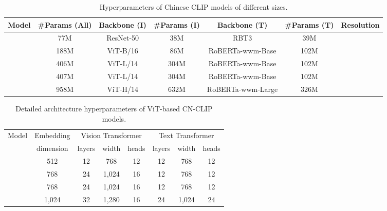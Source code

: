 \documentclass[11pt]{article}
\begin{document}
\begin{table*}[t]
\center
\small
\vskip 0.15in
\begin{adjustbox}{max width=1.\textwidth}
\begin{tabular}{@{\extracolsep{\fill}}lcccccc}
\toprule
  Model
  & \#Params (All)
  & Backbone (I)
  & \#Params (I)
  & Backbone (T)
  & \#Params (T)
  & Resolution
  \\
\midrule
    
    & 77M & ResNet-50 & 38M & RBT3 & 39M & 
    \\
    
    & 188M & ViT-B/16 & 86M & RoBERTa-wwm-Base & 102M & 
    \\
    
    & 406M & ViT-L/14 & 304M & RoBERTa-wwm-Base & 102M & 
    \\
    
    & 407M & ViT-L/14 & 304M & RoBERTa-wwm-Base & 102M & 
    \\
    
    & 958M & ViT-H/14 & 632M & RoBERTa-wwm-Large & 326M & 
    \\
\bottomrule
\end{tabular}
\end{adjustbox}
\caption{Hyperparameters of Chinese CLIP models of different sizes. }
\label{tb:modelcard}
\end{table*} 
\begin{table*}[t]
\center
\small
\begin{tabular}{@{\extracolsep{\fill}}lccccccc}
\toprule
  \multirow{2}{*}{Model}
  & Embedding
  & \multicolumn{3}{c}{Vision Transformer}
  & \multicolumn{3}{c}{Text Transformer}
  \\
  & dimension
  & layers
  & width
  & heads
  & layers
  & width
  & heads
  \\
\midrule

    & 512
    & 12
    & 768
    & 12
    & 12
    & 768
    & 12
    \\
    
    & 768
    & 24
    & 1,024
    & 16
    & 12
    & 768
    & 12
    \\
    
    & 768
    & 24
    & 1,024
    & 16
    & 12
    & 768
    & 12
    \\
    
    & 1,024
    & 32
    & 1,280
    & 16
    & 24
    & 1,024
    & 24
    \\
\bottomrule
\end{tabular}
\caption{Detailed architecture hyperparameters of ViT-based CN-CLIP models.}
\label{tb:detailed_architecture_vit}
\end{table*}
\end{document}
